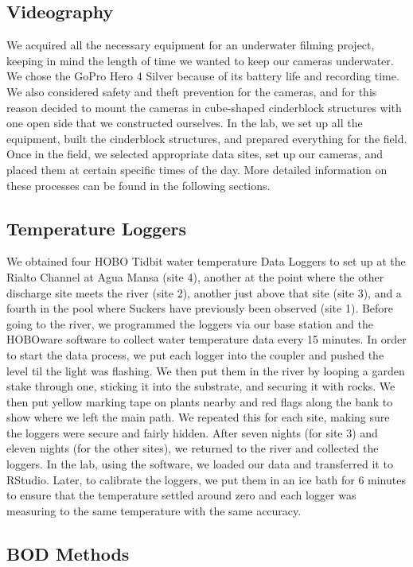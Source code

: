 \documentclass{article}\usepackage[]{graphicx}\usepackage[]{color}
\begin{document}
\subsection{Videography}

We acquired all the necessary equipment for an underwater filming project, keeping in mind the length of time we wanted to keep our cameras underwater. We chose the GoPro Hero 4 Silver because of its battery life and recording time. We also considered safety and theft prevention for the cameras, and for this reason decided to mount the cameras in cube-shaped cinderblock structures with one open side that we constructed ourselves. In the lab, we set up all the equipment, built the cinderblock structures, and prepared everything for the field. Once in the field, we selected appropriate data sites, set up our cameras, and placed them at certain specific times of the day. More detailed information on these processes can be found in the following sections.

\subsection{Temperature Loggers}
We obtained four HOBO Tidbit water temperature Data Loggers to set up at the Rialto Channel at Agua Mansa (site 4), another at the point where the other discharge site meets the river (site 2), another just above that site (site 3), and a fourth in the pool where Suckers have previously been observed (site 1). Before going to the river, we programmed the loggers via our base station and the HOBOware software to collect water temperature data every 15 minutes. In order to start the data process, we put each logger into the coupler and pushed the level til the light was flashing. We then put them in the river by looping a garden stake through one, sticking it into the substrate, and securing it with rocks. We then put yellow marking tape on plants nearby and red flags along the bank to show where we left the main path. We repeated this for each site, making sure the loggers were secure and fairly hidden. After seven nights (for site 3) and eleven nights (for the other sites), we returned to the river and collected the loggers. In the lab, using the software, we loaded our data and transferred it to RStudio. Later, to calibrate the loggers, we put them in an ice bath for 6 minutes to ensure that the temperature settled around zero and each logger was measuring to the same temperature with the same accuracy.

\subsection{BOD Methods}
\end{document}
